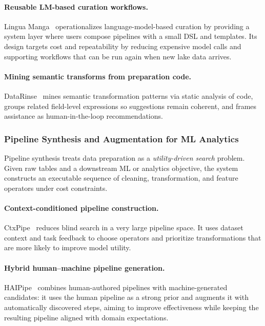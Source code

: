 \documentclass[sigconf,nonacm]{acmart}
\begin{document}
\paragraph{Reusable LM-based curation workflows.}
Lingua Manga~\cite{10.14778/3611540.3611624} operationalizes language-model-based curation by providing a system layer where users compose pipelines with a small DSL and templates. Its design targets cost and repeatability by reducing expensive model calls and supporting workflows that can be run again when new lake data arrives.

\paragraph{Mining semantic transforms from preparation code.}
DataRinse~\cite{10.14778/3611540.3611628} mines semantic transformation patterns via static analysis of code, groups related field-level expressions so suggestions remain coherent, and frames assistance as human-in-the-loop recommendations.



\subsubsection{Pipeline Synthesis and Augmentation for ML Analytics}
Pipeline synthesis treats data preparation as a \emph{utility-driven search} problem. Given raw tables and a downstream ML or analytics objective, the system constructs an executable sequence of cleaning, transformation, and feature operators under cost constraints.

\paragraph{Context-conditioned pipeline construction.}
CtxPipe~\cite{10.1145/3698831} reduces blind search in a very large pipeline space. It uses dataset context and task feedback to choose operators and prioritize transformations that are more likely to improve model utility.

\paragraph{Hybrid human--machine pipeline generation.}
HAIPipe~\cite{10.1145/3588945} combines human-authored pipelines with machine-generated candidates: it uses the human pipeline as a strong prior and augments it with automatically discovered steps, aiming to improve effectiveness while keeping the resulting pipeline aligned with domain expectations.
\end{document}
